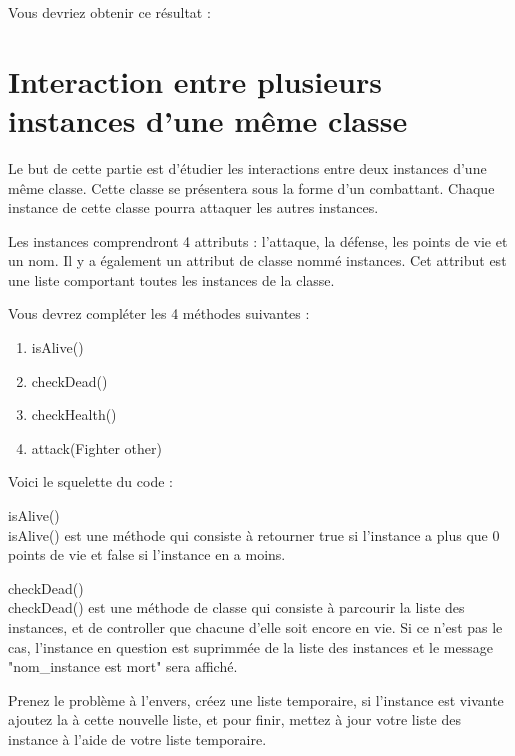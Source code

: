 	
	
Vous devriez obtenir ce résultat :

	

\section{Interaction entre plusieurs instances d'une même classe}
Le but de cette partie est d'étudier les interactions entre deux instances d'une même classe. Cette classe se présentera sous la forme d'un combattant. Chaque instance de cette classe pourra attaquer les autres instances.

Les instances comprendront 4 attributs : l'attaque, la défense, les points de vie et un nom. Il y a également un attribut de classe nommé instances. Cet attribut est une liste comportant toutes les instances de la classe.

Vous devrez compléter les 4 méthodes suivantes :
\begin{enumerate}
\item isAlive()
\item checkDead()
\item checkHealth()
\item attack(Fighter other)
\end{enumerate}


Voici le squelette du code : \\



\begin{Exercice} isAlive()\\
    isAlive() est une méthode qui consiste à retourner true si l'instance a plus que 0 points de vie et false si l'instance en a moins.

\begin{solution}
	
\end{solution}
\end{Exercice}


\begin{Exercice} checkDead()\\
    checkDead() est une méthode de classe qui consiste à parcourir la liste des instances, et de controller que chacune d'elle soit encore en vie. Si ce n'est pas le cas, l'instance en question est suprimmée de la liste des instances et le message "nom\_instance est mort" sera affiché.
    
\begin{conseil}
Prenez le problème à l'envers, créez une liste temporaire, si l'instance est vivante ajoutez la à cette nouvelle liste, et pour finir, mettez à jour votre liste des instance à l'aide de votre liste temporaire.
\end{conseil}

\begin{solution}
	
\end{solution}
\end{Exercice}

